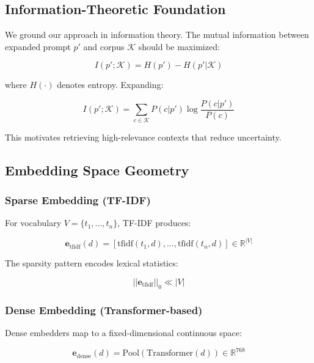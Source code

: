 \documentclass[11pt,a4paper]{article}
\newcommand{\corpus}{\mathcal{K}}
\begin{document}
\subsection{Information-Theoretic Foundation}

We ground our approach in information theory. The mutual information between expanded prompt $p'$ and corpus $\corpus$ should be maximized:

\begin{equation}
I(p'; \corpus) = H(p') - H(p' | \corpus)
\end{equation}

where $H(\cdot)$ denotes entropy. Expanding:

\begin{equation}
I(p'; \corpus) = \sum_{c \in \corpus} P(c|p') \log \frac{P(c|p')}{P(c)}
\end{equation}

This motivates retrieving high-relevance contexts that reduce uncertainty.

\subsection{Embedding Space Geometry}

\subsubsection{Sparse Embedding (TF-IDF)}

For vocabulary $V = \{t_1, ..., t_n\}$, TF-IDF produces:

\begin{equation}
\mathbf{e}_{\text{tfidf}}(d) = \left[\text{tfidf}(t_1, d), ..., \text{tfidf}(t_n, d)\right] \in \mathbb{R}^{|V|}
\end{equation}

The sparsity pattern encodes lexical statistics:

\begin{equation}
||\mathbf{e}_{\text{tfidf}}||_0 \ll |V|
\end{equation}

\subsubsection{Dense Embedding (Transformer-based)}

Dense embedders map to a fixed-dimensional continuous space:

\begin{equation}
\mathbf{e}_{\text{dense}}(d) = \text{Pool}\left(\text{Transformer}(d)\right) \in \mathbb{R}^{768}
\end{equation}
\end{document}
